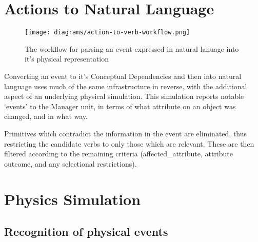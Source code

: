 \documentclass{article}
\begin{document}
    \section{Actions to Natural Language}
    \begin{figure}[h]
        \begin{center}        
            \texttt{[image: diagrams/action-to-verb-workflow.png]}
        \end{center}
        \caption{The workflow for parsing an event expressed in natural lanuage into it's physical representation}
    \end{figure}

    Converting an event to it's Conceptual Dependencies and then into natural language uses much of the same infrastructure in reverse, with the additional aspect of an underlying physical simulation. This simulation reports notable `events' to the Manager unit, in terms of what attribute on an object was changed, and in what way.

    Primitives which contradict the information in the event are eliminated, thus restricting the candidate verbs to only those which are relevant. These are then filtered according to the remaining criteria (affected_attribute, attribute outcome, and any selectional restrictions).

    \section{Physics Simulation}
    \subsection{Recognition of physical events}
\end{document}
